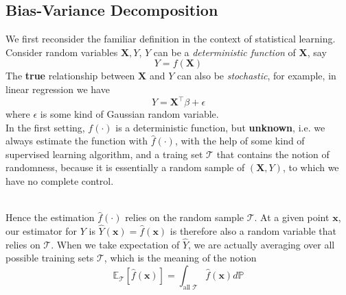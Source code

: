 \documentclass[a4paper, 11pt]{article}
\begin{document}
\subsection{Bias-Variance Decomposition}
We first reconsider the familiar definition in the context of statistical learning. Consider random variables $\bm{X}, Y$, $Y$ can be a \emph{deterministic function} of $\bm{X}$, say
$$
Y = f(\bm{X})
$$
The \textbf{true} relationship between $\bm{X}$ and $Y$ can also be \emph{stochastic}, for example, in linear regression we have
$$
Y = \bm{X}^{\top} \beta + \epsilon 
$$
where $\epsilon$ is some kind of Gaussian random variable. 
~\\
In the first setting, $f(\cdot)$ is a deterministic function, but \textbf{unknown}, i.e. we always estimate the function with $\hat{f}(\cdot)$, with the help of some kind of supervised learning algorithm, and a traing set $\mathcal{T}$ that contains the notion of randomness, because it is essentially a random sample of $(\bm{X}, Y)$, to which we have no complete control. 

~\\
Hence the estimation $\hat{f}(\cdot)$ relies on the random sample $\mathcal{T}$. At a given point $\bm{x}$, our estimator for $Y$ is $\hat{Y}(\bm{x}) = \hat{f}(\bm{x})$ is therefore also a random variable that relies on $\mathcal{T}$. When we take expectation of $\hat{Y}$, we are actually averaging over all possible training sets $\mathcal{T}$, which is the meaning of the notion 
$$
\mathbb{E}_{\mathcal{T}}\left[\hat{f}(\bm{x})\right] = \int_{\text{all } \mathcal{T}} \hat{f}(\bm{x}) d\mathbb{P}
$$
\end{document}
